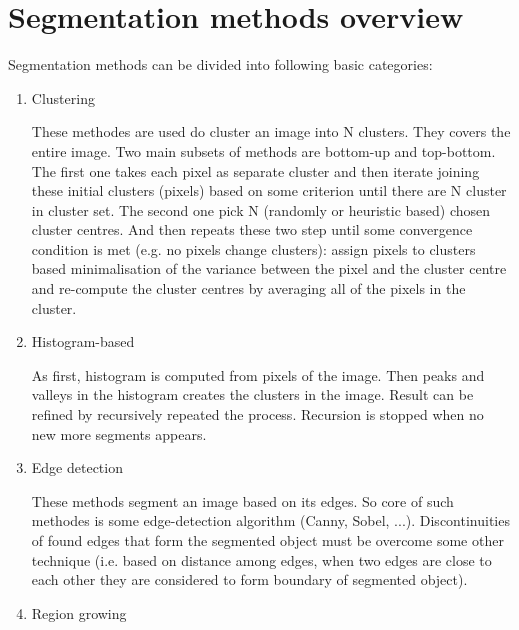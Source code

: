 \section{Segmentation methods overview}

Segmentation methods can be divided into following basic categories:

\begin{enumerate}

  \item Clustering

  These methodes are used do cluster an image into N clusters.
They covers the entire image.
Two main subsets of methods are bottom-up and top-bottom.
The first one takes each pixel as separate cluster and then iterate joining these initial clusters (pixels) based on some criterion until there are N cluster in cluster set.
The second one pick N (randomly or heuristic based) chosen cluster centres.
And then repeats these two step until some convergence condition is met (e.g. no pixels change clusters): assign pixels to clusters based minimalisation of the variance between the pixel and the cluster centre and re-compute the cluster centres by averaging all of the pixels in the cluster.

  \item Histogram-based

  As first, histogram is computed from pixels of the image.
Then peaks and valleys in the histogram creates the clusters in the image.
Result can be refined by recursively repeated the process.
Recursion is stopped when no new more segments appears.

  \item Edge detection

  These methods segment an image based on its edges.
So core of such methodes is some edge-detection algorithm (Canny, Sobel, ...).
Discontinuities of found edges that form the segmented object must be overcome some other technique (i.e. based on distance among edges, when two edges are close to each other they are considered to form boundary of segmented object).

  \item Region growing


\end{enumerate}
